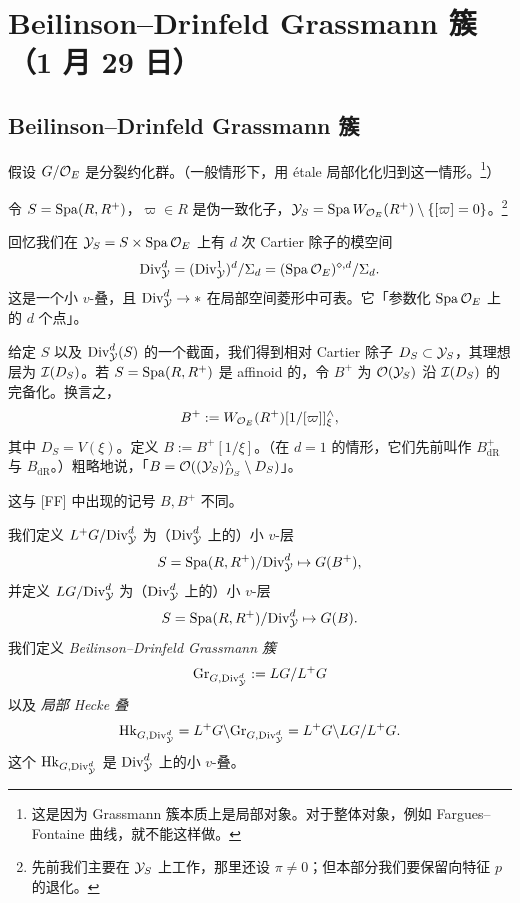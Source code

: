 \section[Beilinson--Drinfeld Grassmann 簇]{Beilinson--Drinfeld Grassmann 簇（1 月 29 日）}


\subsection{Beilinson--Drinfeld Grassmann 簇}

假设 $G/\mathcal{O}_E$ 是分裂约化群。（一般情形下，用 étale 局部化化归到这一情形。\footnote{这是因为 Grassmann 簇本质上是局部对象。对于整体对象，例如 Fargues--Fontaine 曲线，就不能这样做。}）

令 $S=\operatorname{Spa}(R,R^+)$，$\varpi\in R$ 是伪一致化子，$\mathcal{Y}_S=\operatorname{Spa} W_{\mathcal{O}_E}(R^+)\setminus\{[\varpi]=0\}$。\footnote{先前我们主要在 $\mathcal{Y}_S$ 上工作，那里还设 $\pi\neq0$；但本部分我们要保留向特征 $p$ 的退化。}

回忆我们在 $\mathcal{Y}_S=S\times\operatorname{Spa}\mathcal{O}_E$ 上有 $d$ 次 Cartier 除子的模空间
\[
\mathrm{Div}^d_{\mathcal{Y}}=(\mathrm{Div}^1_{\mathcal{Y}})^d/\Sigma_d=(\operatorname{Spa}\mathcal{O}_E)^{\diamond,d}/\Sigma_d.
\]
这是一个小 $v$-叠，且 $\mathrm{Div}^d_{\mathcal{Y}}\to*$ 在局部空间菱形中可表。它「参数化 $\operatorname{Spa}\mathcal{O}_E$ 上的 $d$ 个点」。

给定 $S$ 以及 $\mathrm{Div}^d_{\mathcal{Y}}(S)$ 的一个截面，我们得到相对 Cartier 除子 $D_S\subset\mathcal{Y}_S$，其理想层为 $\mathcal{I}(D_S)$。若 $S=\operatorname{Spa}(R,R^+)$ 是 affinoid 的，令 $B^+$ 为 $\mathcal{O}(\mathcal{Y}_S)$ 沿 $\mathcal{I}(D_S)$ 的完备化。换言之，
\[
B^+:=W_{\mathcal{O}_E}(R^+)[1/[\varpi]]^\wedge_\xi,
\]
其中 $D_S=V(\xi)$。定义 $B:=B^+[1/\xi]$。（在 $d=1$ 的情形，它们先前叫作 $B^+_{\mathrm{dR}}$ 与 $B_{\mathrm{dR}}$。）粗略地说，「$B=\mathcal{O}((\mathcal{Y}_S)^\wedge_{D_S}\setminus D_S)$」。

\begin{warning}
这与 [FF] 中出现的记号 $B,B^+$ 不同。
\end{warning}

\begin{definition}
我们定义 $L^+G/\mathrm{Div}^d_{\mathcal{Y}}$ 为（$\mathrm{Div}^d_{\mathcal{Y}}$ 上的）小 $v$-层
\[
S=\operatorname{Spa}(R,R^+)/\mathrm{Div}^d_{\mathcal{Y}}\mapsto G(B^+),
\]
并定义 $LG/\mathrm{Div}^d_{\mathcal{Y}}$ 为（$\mathrm{Div}^d_{\mathcal{Y}}$ 上的）小 $v$-层
\[
S=\operatorname{Spa}(R,R^+)/\mathrm{Div}^d_{\mathcal{Y}}\mapsto G(B).
\]
我们定义 \emph{Beilinson--Drinfeld Grassmann 簇}
\[
\mathrm{Gr}_{G,\mathrm{Div}^d_{\mathcal{Y}}}:=LG/L^+G
\]
以及 \emph{局部 Hecke 叠}
\[
\mathrm{Hk}_{G,\mathrm{Div}^d_{\mathcal{Y}}}=L^+G\backslash\mathrm{Gr}_{G,\mathrm{Div}^d_{\mathcal{Y}}}=L^+G\backslash LG/L^+G.
\]
这个 $\mathrm{Hk}_{G,\mathrm{Div}^d_{\mathcal{Y}}}$ 是 $\mathrm{Div}^d_{\mathcal{Y}}$ 上的小 $v$-叠。
\end{definition}

